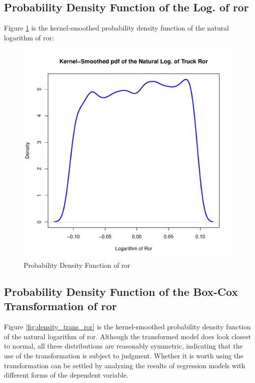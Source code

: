 \documentclass[11pt]{paper}
\begin{document}
\subsection{Probability Density Function of the Log. of ror}

Figure \ref{fig:density_log_ror} is the kernel-smoothed probability density function of the natural logarithm of
ror:

\begin{figure}[h!]
  \centering
  \includegraphics[scale = 0.5, keepaspectratio=true]{../Figures/density_log_ror}
  \caption{Probability Density Function of ror} \label{fig:density_log_ror}
\end{figure}



\pagebreak
\subsection{Probability Density Function of the Box-Cox Transformation of ror}

Figure \ref{fig:density_trans_ror} is the kernel-smoothed probability density function of the natural logarithm of
ror. 
Although the transformed model does look closest to normal,
all three distributions are reasonably symmetric, 
indicating that the use of the transformation is subject to judgment.
Whether it is worth using the transformation
can be settled by analyzing the results of regression models 
with different forms of the dependent variable. 
\end{document}
